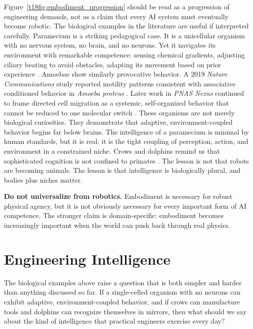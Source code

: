 \documentclass[12pt]{article}
\begin{document}
Figure~\ref{t18fig:embodiment_progression} should be read as a progression of engineering demands, not as a claim that every AI system must eventually become robotic. The biological examples in the literature are useful if interpreted carefully. Paramecium is a striking pedagogical case. It is a unicellular organism with no nervous system, no brain, and no neurons. Yet it navigates its environment with remarkable competence: sensing chemical gradients, adjusting ciliary beating to avoid obstacles, adapting its movement based on prior experience \cite{brette2021paramecium}. Amoebae show similarly provocative behavior. A 2019 \emph{Nature Communications} study reported motility patterns consistent with associative conditioned behavior in \emph{Amoeba proteus} \cite{delafuente2019amoeba}. Later work in \emph{PNAS Nexus} continued to frame directed cell migration as a systemic, self-organized behavior that cannot be reduced to one molecular switch \cite{delafuente2024migration}. These organisms are not merely biological curiosities. They demonstrate that adaptive, environment-coupled behavior begins far below brains. The intelligence of a paramecium is minimal by human standards, but it is real: it is the tight coupling of perception, action, and environment in a constrained niche. Crows and dolphins remind us that sophisticated cognition is not confined to primates \cite{hunt1996crows,vonbayern2018compoundcrows,reiss2001dolphin}. The lesson is not that robots are becoming animals. The lesson is that intelligence is biologically plural, and bodies plus niches matter.

\begin{alert-box}
\textbf{Do not universalize from robotics.} Embodiment is necessary for robust physical agency, but it is not obviously necessary for every important form of AI competence. The stronger claim is domain-specific: embodiment becomes increasingly important when the world can push back through real physics.
\end{alert-box}

\section{Engineering Intelligence}

The biological examples above raise a question that is both simpler and harder than anything discussed so far. If a single-celled organism with no neurons can exhibit adaptive, environment-coupled behavior, and if crows can manufacture tools and dolphins can recognize themselves in mirrors, then what should we say about the kind of intelligence that practical engineers exercise every day?
\end{document}
